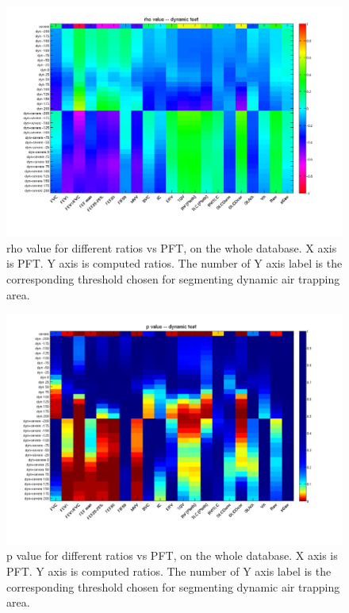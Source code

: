 \documentclass[12pt]{article}
\begin{document}
\begin{figure}
    \includegraphics[width=0.84\linewidth,viewport=100 60 720 550]{dyn/rho_dyn.png}
    \caption{rho value for different ratios vs PFT, on the whole database. X axis is PFT. Y axis is computed ratios. The number of Y axis label is the corresponding threshold chosen for segmenting dynamic air trapping area.}
    \label{fig:rho-ILD----metrics-vs-PFT----Whole-Lung-Expiration}
\end{figure}
\begin{figure}
    \includegraphics[width=0.84\linewidth,viewport=100 60 720 550]{dyn/p_dyn.png}
    \caption{p value for different ratios vs PFT, on the whole database. X axis is PFT. Y axis is computed ratios. The number of Y axis label is the corresponding threshold chosen for segmenting dynamic air trapping area.}
    \label{fig:p-ILD----metrics-vs-PFT----Whole-Lung-Expiration}
\end{figure}


\end{document}
